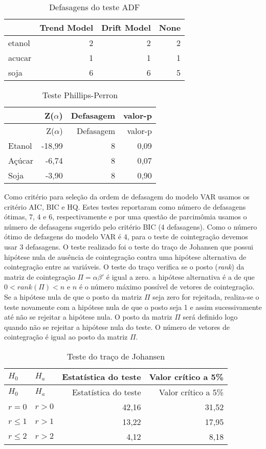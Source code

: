 \documentclass[]{article}
\begin{document}
\begin{longtable}[t]{lrrr}
\caption{\label{tab:ADF e KPSS nivel}Defasagens do teste ADF}\\
\toprule
  & Trend Model & Drift Model & None\\
\midrule
etanol & 2 & 2 & 2\\
acucar & 1 & 1 & 1\\
soja & 6 & 6 & 5\\
\bottomrule
\end{longtable}

\begin{longtable}[]{@{}lrrr@{}}
\caption{Teste Phillips-Perron}\tabularnewline
\toprule
& Z(\(\alpha\)) & Defasagem & valor-p\tabularnewline
\midrule
\endfirsthead
\toprule
& Z(\(\alpha\)) & Defasagem & valor-p\tabularnewline
\midrule
\endhead
Etanol & -18,99 & 8 & 0,09\tabularnewline
Açúcar & -6,74 & 8 & 0,07\tabularnewline
Soja & -3,90 & 8 & 0,90\tabularnewline
\bottomrule
\end{longtable}

Como critério para seleção da ordem de defasagem do modelo VAR usamos os
critério AIC, BIC e HQ. Estes testes reportaram como número de
defasagens ótimas, 7, 4 e 6, respectivamente e por uma questão de
parcimômia usamos o número de defasagens sugerido pelo critério BIC (4
defasagens). Como o número ótimo de defasgens do modelo VAR é 4, para o
teste de cointegração devemos usar 3 defasagens. O teste realizado foi o
teste do traço de Johansen que possui hipótese nula de ausência de
cointegração contra uma hipótese alternativa de cointegração entre as
variáveis. O teste do traço verifica se o posto (\emph{rank}) da matriz
de cointegração \(\Pi = \alpha \beta'\) é igual a zero. a hipótese
alternativa é a de que \(0<rank(\Pi)<n\) e \(n\) é o número máximo
possível de vetores de cointegração. Se a hipótese nula de que o posto
da matriz \(\Pi\) seja zero for rejeitada, realiza-se o teste novamente
com a hipótese nula de que o posto seja 1 e assim sucessivamente até não
se rejeitar a hipótese nula. O posto da matriz \(\Pi\) será definido
logo quando não se rejeitar a hipótese nula do teste. O número de
vetores de cointegração é igual ao posto da matriz \(\Pi\).

\begin{longtable}[]{@{}llrr@{}}
\caption{Teste do traço de Johansen}\tabularnewline
\toprule
\(H_0\) & \(H_a\) & Estatística do teste & Valor crítico a
5\%\tabularnewline
\midrule
\endfirsthead
\toprule
\(H_0\) & \(H_a\) & Estatística do teste & Valor crítico a
5\%\tabularnewline
\midrule
\endhead
\(r=0\) & \(r>0\) & 42,16 & 31,52\tabularnewline
\(r\leq 1\) & \(r>1\) & 13,22 & 17,95\tabularnewline
\(r\leq 2\) & \(r>2\) & 4,12 & 8,18\tabularnewline
\bottomrule
\end{longtable}
\end{document}
